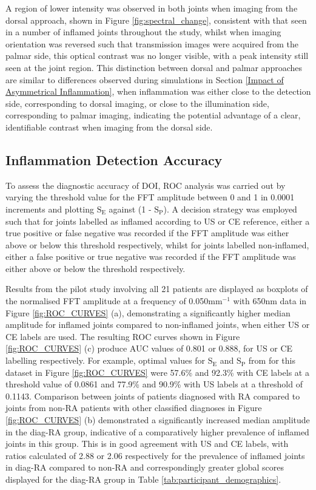 \documentclass[twoside]{bhamthesis}
\theoremstyle{definition}
\begin{document}
A region of lower intensity was observed in both joints when imaging from the dorsal approach, shown in  Figure \ref{fig:spectral_change}, consistent with that seen in a number of inflamed joints throughout the study, whilst when imaging orientation was reversed such that transmission images were acquired from the palmar side, this optical contrast was no longer visible, with a peak intensity still seen at the joint region. This distinction between dorsal and palmar approaches are similar to differences observed during simulations in Section \ref{Impact of Asymmetrical Inflammation}, when inflammation was either close to the detection side, corresponding to dorsal imaging, or close to the illumination side, corresponding to palmar imaging, indicating the potential advantage of a clear, identifiable contrast when imaging from the dorsal side. 

\subsection{Inflammation Detection Accuracy}

To assess the diagnostic accuracy of DOI, ROC analysis was carried out by varying the threshold value for the FFT amplitude between 0 and 1 in 0.0001 increments and plotting $\mathrm{S_E}$ against (1 - $\mathrm{S_P}$). A decision strategy was employed such that for joints labelled as inflamed according to US or CE reference, either a true positive or false negative was recorded if the FFT amplitude was either above or below this threshold respectively, whilst for joints labelled non-inflamed, either a false positive or true negative was recorded if the FFT amplitude was either above or below the threshold respectively.

Results from the pilot study involving all 21 patients are displayed as boxplots of the normalised FFT amplitude at a frequency of 0.050mm$^{-1}$ with 650nm data in Figure \ref{fig:ROC_CURVES} (a), demonstrating a significantly higher median amplitude for inflamed joints compared to non-inflamed joints, when either US or CE labels are used. The resulting ROC curves shown in Figure \ref{fig:ROC_CURVES} (c) produce AUC values of  0.801 or 0.888, for US or CE labelling respectively. For example, optimal values for $\mathrm{S_E}$ and $\mathrm{S_P}$ from for this dataset in Figure \ref{fig:ROC_CURVES} were 57.6\% and 92.3\% with CE labels at a threshold value of 0.0861 and 77.9\% and 90.9\% with US labels at a threshold of 0.1143. Comparison between joints of patients diagnosed with RA compared to joints from non-RA patients with other classified diagnoses in Figure \ref{fig:ROC_CURVES} (b) demonstrated a significantly increased median amplitude in the diag-RA group, indicative of a comparatively higher prevalence of inflamed joints in this group. This is in good agreement with US and CE labels, with ratios calculated of 2.88 or 2.06 respectively for the prevalence of inflamed joints in diag-RA compared to non-RA and correspondingly greater global scores displayed for the diag-RA group in Table 
\ref{tab:participant_demographics}.
\end{document}
